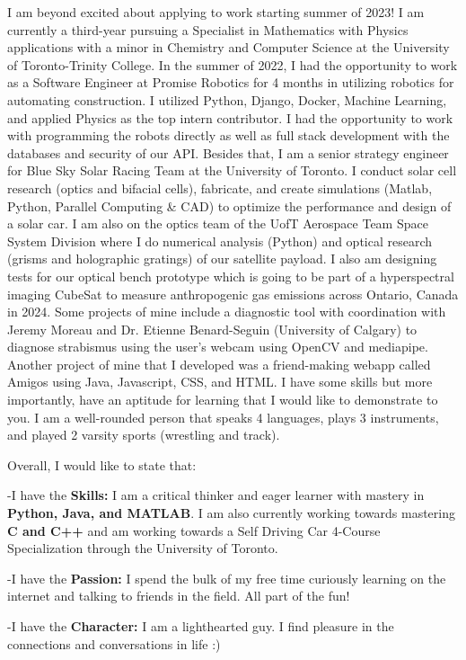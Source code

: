 \documentclass[11pt,a4]{article}
\newcommand{\bold}[1]{ {\bfseries #1}}
\begin{document}
I am beyond excited about applying to work starting summer of 2023! 
I am currently a third-year pursuing a Specialist in Mathematics with 
Physics applications with a minor in Chemistry and Computer Science at 
the University of Toronto-Trinity College. In the summer of 2022, I had 
the opportunity to work as a Software Engineer at Promise Robotics for 4 
months in utilizing robotics for automating construction. I utilized Python,
 Django, Docker, Machine Learning, and applied Physics as the top intern 
 contributor. I had the opportunity to work with programming the robots directly 
 as well as full stack development with the databases and security of our API.
  Besides that, I am a senior strategy engineer for Blue Sky Solar Racing Team 
  at the University of Toronto. I conduct solar cell research (optics and bifacial cells),
   fabricate, and create simulations (Matlab, Python, Parallel Computing \& CAD) to optimize
    the performance and design of a solar car. I am also on the optics team of the UofT 
    Aerospace Team Space System Division where I do numerical analysis (Python) and 
    optical research (grisms and holographic gratings) of our satellite payload. I 
    also am designing tests for our optical bench prototype which is going to be part of 
    a hyperspectral imaging CubeSat to measure anthropogenic gas emissions across Ontario, 
    Canada in 2024. Some projects of mine include a diagnostic tool with coordination with 
    Jeremy Moreau and Dr. Etienne Benard-Seguin (University of Calgary) to diagnose strabismus 
    using the user’s webcam using OpenCV and mediapipe. Another  project of mine that I developed
     was a friend-making webapp called Amigos using Java, Javascript, CSS, and HTML. I have 
     some skills but more importantly, have an aptitude for learning that I would like to 
     demonstrate to you. I am a well-rounded person that speaks 4 languages, plays 3 
     instruments, and played 2 varsity sports (wrestling and track). \par
     Overall, I would like to state that:


-I have the \bold{Skills:} I am a critical thinker and eager learner with mastery in
\bold{Python, Java, and MATLAB}. I am also currently working towards mastering
\bold{C and C++} and am working towards a Self Driving Car 4-Course Specialization
through the University of Toronto.\par

-I have the \bold{Passion:} I spend the bulk of my free time curiously learning 
on the internet and talking to friends in the field. All part of the fun!\par
-I have the \bold{Character:} I am a lighthearted guy. I find pleasure in the
 connections and conversations in life  :)
\end{document}
